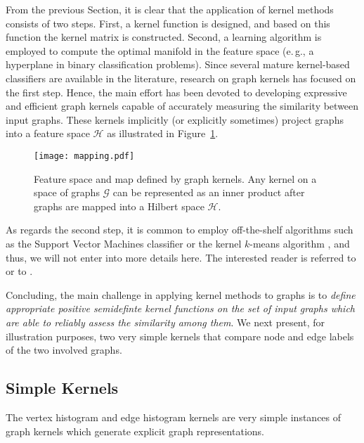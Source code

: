 \documentclass[twoside,11pt]{article}
\newcommand{\eg}{e.\,g., }
\begin{document}
From the previous Section, it is clear that the application of kernel methods consists of two steps.
First, a kernel function is designed, and based on this function the kernel matrix is constructed.
Second, a learning algorithm is employed to compute the optimal manifold in the feature space (\eg a hyperplane in binary classification problems).
Since several mature kernel-based classifiers are available in the literature, research on graph kernels has focused on the first step.
Hence, the main effort has been devoted to developing expressive and efficient graph kernels capable of accurately measuring the similarity between input graphs.
These kernels implicitly (or explicitly sometimes) project graphs into a feature space $\mathcal{H}$ as illustrated in Figure~\ref{fig:mapping}.
\begin{figure}
  \centering
  \texttt{[image: mapping.pdf]}
    \caption{Feature space and map defined by graph kernels.
    Any kernel on a space of graphs $\mathcal{G}$ can be represented as an inner product after graphs are mapped into a Hilbert space $\mathcal{H}$.}
    \label{fig:mapping}
\end{figure}
As regards the second step, it is common to employ off-the-shelf algorithms such as the Support Vector Machines classifier  or the kernel $k$-means algorithm , and thus, we will not enter into more details here.
The interested reader is referred to  or to .

Concluding, the main challenge in applying kernel methods to graphs is  to \textit{define appropriate positive semidefinte kernel functions on the set of input graphs which are able to reliably assess the similarity among them}.
We next present, for illustration purposes, two very simple kernels that compare node and edge labels of the two involved graphs.

\subsection{Simple Kernels}
The vertex histogram and edge histogram kernels are very simple instances of graph kernels which generate explicit graph representations.
\end{document}
